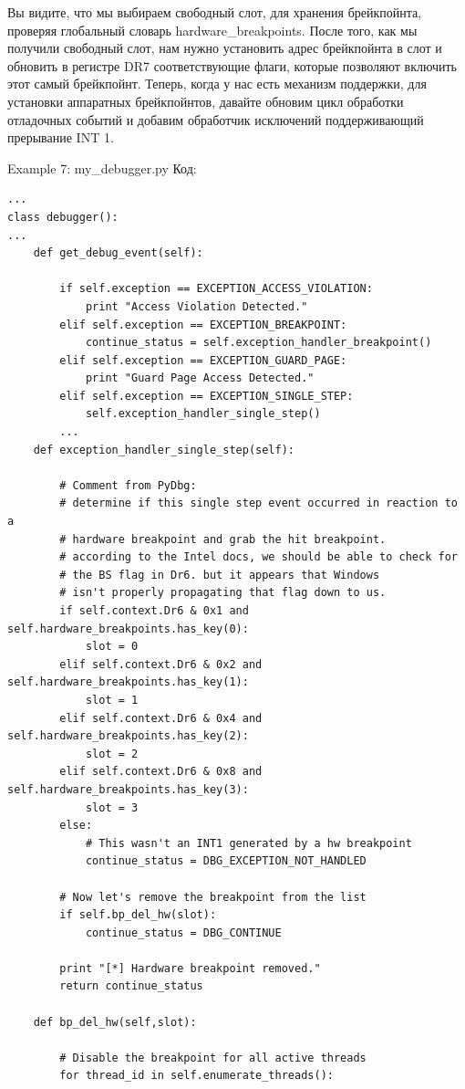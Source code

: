 \documentclass[12pt, a4paper, oneside]{book}
\begin{document}
Вы видите, что мы выбираем свободный слот, для хранения брейкпойнта, проверяя глобальный словарь hardware\_breakpoints. После того, как мы получили свободный слот, нам нужно установить адрес брейкпойнта в слот и обновить в регистре DR7 соответствующие флаги, которые позволяют включить этот самый брейкпойнт. Теперь, когда у нас есть механизм поддержки, для установки аппаратных брейкпойнтов, давайте обновим цикл обработки отладочных событий и добавим обработчик исключений поддерживающий прерывание INT 1.

Example 7: my\_debugger.py
Код:
\begin{verbatim}
...
class debugger():
...
    def get_debug_event(self):

        if self.exception == EXCEPTION_ACCESS_VIOLATION:
            print "Access Violation Detected."
        elif self.exception == EXCEPTION_BREAKPOINT:
            continue_status = self.exception_handler_breakpoint()
        elif self.exception == EXCEPTION_GUARD_PAGE:
            print "Guard Page Access Detected."
        elif self.exception == EXCEPTION_SINGLE_STEP:
            self.exception_handler_single_step()
        ...
    def exception_handler_single_step(self):

        # Comment from PyDbg:
        # determine if this single step event occurred in reaction to a
        # hardware breakpoint and grab the hit breakpoint.
        # according to the Intel docs, we should be able to check for
        # the BS flag in Dr6. but it appears that Windows
        # isn't properly propagating that flag down to us.
        if self.context.Dr6 & 0x1 and self.hardware_breakpoints.has_key(0):
            slot = 0
        elif self.context.Dr6 & 0x2 and self.hardware_breakpoints.has_key(1):
            slot = 1
        elif self.context.Dr6 & 0x4 and self.hardware_breakpoints.has_key(2):
            slot = 2
        elif self.context.Dr6 & 0x8 and self.hardware_breakpoints.has_key(3):
            slot = 3
        else:
            # This wasn't an INT1 generated by a hw breakpoint
            continue_status = DBG_EXCEPTION_NOT_HANDLED

        # Now let's remove the breakpoint from the list
        if self.bp_del_hw(slot):
            continue_status = DBG_CONTINUE

        print "[*] Hardware breakpoint removed."
        return continue_status

    def bp_del_hw(self,slot):

        # Disable the breakpoint for all active threads
        for thread_id in self.enumerate_threads():


\end{verbatim}
\end{document}

